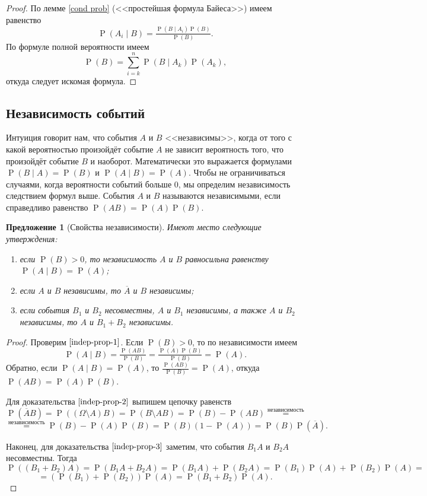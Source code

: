 \documentclass[12pt]{article}
\newtheorem{proposition}{Предложение}
\numberwithin{theorem}{section}
\numberwithin{proposition}{section}
\theoremstyle{definition}
\newcommand{\prob}{\operatorname{P}}
\newcommand{\defin}[2]{\hypertarget{#2}{{\color{red} #1}}}
\begin{document}
	\begin{proof}
		По лемме \ref{cond prob} (<<простейшая формула Байеса>>) имеем равенство
		$$ \prob(A_i \mid B) = \tfrac{\prob(B \mid A_i)\prob(B)}{\prob(B)}. $$
		По формуле полной вероятности имеем
		$$ \prob(B) = \sum\limits_{i = k}^{n} \prob(B \mid A_k)\prob(A_k), $$
		откуда следует искомая формула.
	\end{proof}
	
	\subsection{Независимость событий}
	
	Интуиция говорит нам, что события $ A $ и $ B $ <<независимы>>, когда от того с какой вероятностью произойдёт событие $ A $
	не зависит вероятность того, что произойдёт событие $ B $ и наоборот.
	Математически это выражается формулами $ \prob(B \mid A) = \prob(B) $ и $ \prob(A \mid B) = \prob(A) $.
	Чтобы не ограничиваться случаями, когда вероятности событий больше 0, мы определим независимость
	следствием формул выше. События $ A $ и $ B $ называются \defin{независимыми}{independent}, если справедливо равенство
	$ \prob(AB) = \prob(A)\prob(B) $.
	
	\begin{proposition}[Свойства независимости] \label{indep-prop}
		Имеют место следующие утверждения:
		\begin{enumerate}
			\item если $ \prob(B) > 0 $, 
			то независимость $ A $ и $ B $ равносильна равенству $ \prob(A \mid B) = \prob(A) $; \label{indep-prop-1}
			\item если $ A $ и $ B $ независимы, то $ \overline{A} $ и $ B $ независимы; \label{indep-prop-2}
			\item если события $ B_1 $ и $ B_2 $ несовместны, $ A $ и $ B_1 $ независимы, а также $ A $ и $ B_2 $ независимы, 
			то $ A $ и $ B_1 + B_2 $ независимы. \label{indep-prop-3}
		\end{enumerate}
	\end{proposition}
	
	\begin{proof}
		Проверим $ \ref{indep-prop-1} $.
		Если $ \prob(B) > 0 $, то по независимости имеем 
		$$ \prob(A \mid B) = \tfrac{\prob(AB)}{\prob(B)} = \tfrac{\prob(A)\prob(B)}{\prob(B)} = \prob(A). $$
		Обратно, если $ \prob(A \mid B) = \prob(A) $, то $ \tfrac{\prob(AB)}{\prob(B)} = \prob(A) $, откуда
		$ \prob(AB) = \prob(A)\prob(B) $.
		
		Для доказательства $ \ref{indep-prop-2} $ выпишем цепочку равенств
		$$ \prob(\overline{A}B) = \prob((\Omega \setminus A)B) = \prob(B \setminus AB) 
		= \prob(B) - \prob(AB) \overset{\text{независимость}}{=} $$ 
		$$ \overset{\text{независимость}}{=} \prob(B) - \prob(A)\prob(B) = \prob(B)(1 - \prob(A)) = \prob(B)\prob(\overline{A}). $$
		
		Наконец, для доказательства $ \ref{indep-prop-3} $ заметим, что события $ B_1A $ и $ B_2A $ несовместны.
		Тогда
		$$ \prob((B_1 + B_2)A) = \prob(B_1A + B_2A) = \prob(B_1A) + \prob(B_2A) 
		= \prob(B_1)\prob(A) + \prob(B_2)\prob(A)= $$ 
		$$ = (\prob(B_1) + \prob(B_2))\prob(A) = \prob(B_1 + B_2)\prob(A). $$
	\end{proof}
\end{document}
